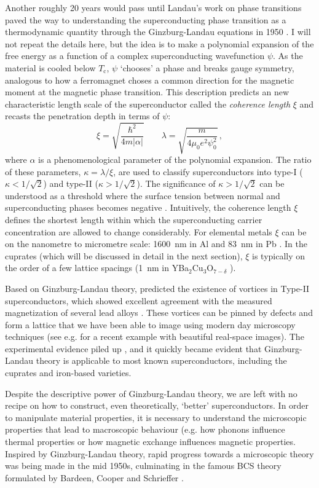 Another roughly 20 years would pass until Landau's work on phase transitions paved the way to understanding the superconducting phase transition as a thermodynamic quantity through the Ginzburg-Landau equations in 1950 \cite{Ginzburg2009}. I will not repeat the details here, but the idea is to make a polynomial expansion of the free energy as a function of a complex superconducting wavefunction $\psi$. As the material is cooled below $T_\text{c}$, $\psi$ `chooses' a phase and breaks gauge symmetry, analogous to how a ferromagnet choses a common direction for the magnetic moment at the magnetic phase transition. This description predicts an new characteristic length scale of the superconductor called the \emph{coherence length} $\xi$ and recasts the penetration depth in terms of $\psi$:
%
\[ \xi = \sqrt{\frac{\hbar^2}{4m|\alpha|}} \qquad \lambda = \sqrt{\frac{m}{4\mu_0 e^2 \psi_0^2 }} \, , \]
%
where $\alpha$ is a phenomenological parameter of the polynomial expansion. The ratio of these parameters, $\kappa = \lambda / \xi$, are used to classify superconductors into type-I ($\kappa < 1 / \sqrt{2}$) and type-II ($\kappa > 1 / \sqrt{2}$). The significance of $\kappa > 1 / \sqrt{2}$ can be understood as a threshold where the surface tension between normal and superconducting phases becomes negative \cite{Abrikosov1957}. Intuitively, the coherence length $\xi$ defines the shortest length within which the superconducting carrier concentration are allowed to change considerably. For elemental metals $\xi$ can be on the nanometre to micrometre scale: \SI{1600}{\nano\meter} in Al and \SI{83}{\nano\meter} in Pb \cite{Kittel2005}. In the cuprates (which will be discussed in detail in the next section), $\xi$ is typically on the order of a few lattice spacings (\SI{1}{\nano\meter} in YBa$_2$Cu$_3$O$_{7-\delta}$ \cite{Tomimoto1999}).

Based on Ginzburg-Landau theory, \citeauthor{Abrikosov1957} predicted the existence of vortices in Type-II superconductors, which showed excellent agreement with the measured magnetization of several lead alloys \cite{Abrikosov1957}. These vortices can be pinned by defects and form a lattice that we have been able to image using modern day microscopy techniques (see e.g. \cite{Wells2015} for a recent example with beautiful real-space images). The experimental evidence piled up \cite{Doll1961, Deaver1961}, and it quickly became evident that Ginzburg-Landau theory is applicable to most known superconductors, including the cuprates and iron-based varieties.

Despite the descriptive power of Ginzburg-Landau theory, we are left with no recipe on how to construct, even theoretically, `better' superconductors. In order to manipulate material properties, it is necessary to understand the microscopic properties that lead to macroscopic behaviour (e.g. how phonons influence thermal properties or how magnetic exchange influences magnetic properties. Inspired by Ginzburg-Landau theory, rapid progress towards a microscopic theory was being made in the mid 1950s, culminating in the famous BCS theory formulated by Bardeen, Cooper and Schrieffer \cite{Bardeen1957}. 

